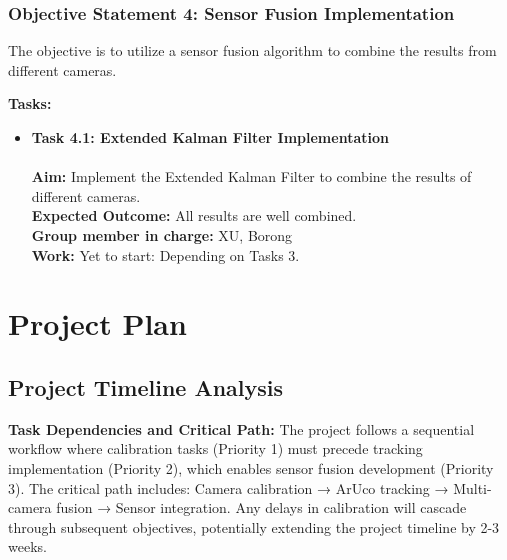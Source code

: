 \documentclass[11pt]{article}
\begin{document}
        \subsubsection{Objective Statement 4: Sensor Fusion Implementation}
        The objective is to utilize a sensor fusion algorithm to combine the results from different cameras.
        
        \textbf{Tasks:}
        \begin{itemize}
            \item \textbf{Task 4.1: Extended Kalman Filter Implementation}\\\\
            \textbf{Aim:} Implement the Extended Kalman Filter to combine the results of different cameras.\\
            \textbf{Expected Outcome:} All results are well combined.\\
            \textbf{Group member in charge:} XU, Borong\\
            \textbf{Work:} Yet to start: Depending on Tasks 3.
        \end{itemize}
    

\section{Project Plan}
    \subsection{Project Timeline Analysis}

        \textbf{Task Dependencies and Critical Path:} The project follows a sequential workflow where calibration tasks (Priority 1) must precede tracking implementation (Priority 2), which enables sensor fusion development (Priority 3). The critical path includes: Camera calibration → ArUco tracking → Multi-camera fusion → Sensor integration. Any delays in calibration will cascade through subsequent objectives, potentially extending the project timeline by 2-3 weeks.
\end{document}
